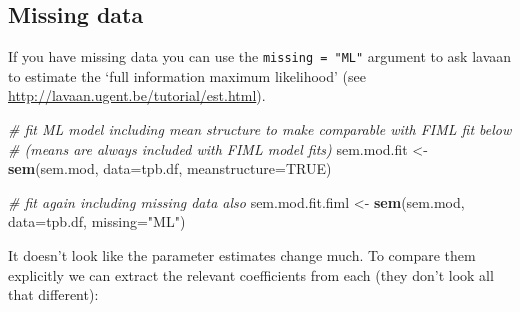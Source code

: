 \documentclass[]{article}
\newenvironment{Shaded}{\begin{snugshade}}{\end{snugshade}}
\newcommand{\CommentTok}[1]{\textcolor[rgb]{0.56,0.35,0.01}{\textit{#1}}}
\newcommand{\DataTypeTok}[1]{\textcolor[rgb]{0.13,0.29,0.53}{#1}}
\newcommand{\KeywordTok}[1]{\textcolor[rgb]{0.13,0.29,0.53}{\textbf{#1}}}
\newcommand{\NormalTok}[1]{#1}
\newcommand{\OtherTok}[1]{\textcolor[rgb]{0.56,0.35,0.01}{#1}}
\newcommand{\StringTok}[1]{\textcolor[rgb]{0.31,0.60,0.02}{#1}}
\begin{document}
\hypertarget{cfa-sem-missing-data}{%
\subsection*{Missing data}\label{cfa-sem-missing-data}}

If you have missing data you can use the \texttt{missing\ =\ "ML"} argument to ask lavaan
to estimate the `full information maximum likelihood' (see
\url{http://lavaan.ugent.be/tutorial/est.html}).

\begin{Shaded}
\begin{Highlighting}[]
\CommentTok{# fit ML model including mean structure to make comparable with FIML fit below}
\CommentTok{# (means are always included with FIML model fits)}
\NormalTok{sem.mod.fit <-}\StringTok{ }\KeywordTok{sem}\NormalTok{(sem.mod, }\DataTypeTok{data=}\NormalTok{tpb.df, }\DataTypeTok{meanstructure=}\OtherTok{TRUE}\NormalTok{)}

\CommentTok{# fit again including missing data also}
\NormalTok{sem.mod.fit.fiml <-}\StringTok{ }\KeywordTok{sem}\NormalTok{(sem.mod, }\DataTypeTok{data=}\NormalTok{tpb.df, }\DataTypeTok{missing=}\StringTok{"ML"}\NormalTok{)}
\end{Highlighting}
\end{Shaded}

It doesn't look like the parameter estimates change much. To compare them
explicitly we can extract the relevant coefficients from each (they don't look
all that different):
\end{document}
